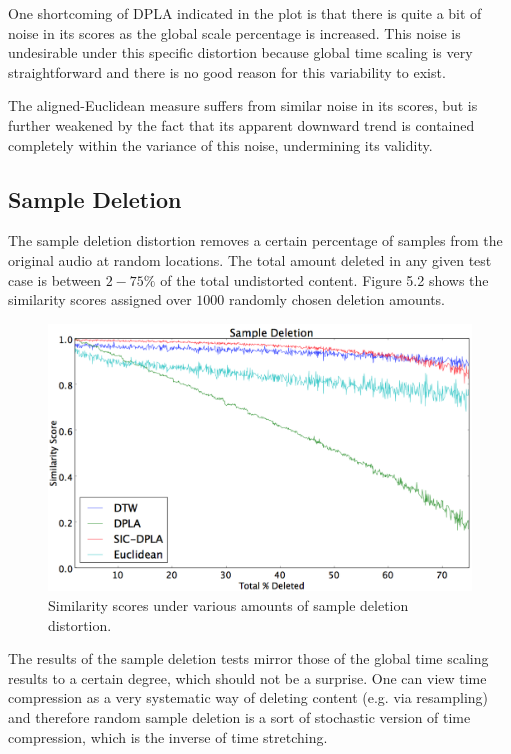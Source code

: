\documentclass[12pt]{report} 	%
\numberwithin{figure}{chapter}
\numberwithin{table}{chapter}
\numberwithin{equation}{chapter}
\begin{document}
\begin{flushleft}
One shortcoming of DPLA indicated in the plot is that there is quite a bit of noise in its scores as the global scale percentage is increased. This noise is undesirable under this specific distortion because global time scaling is very straightforward and there is no good reason for this variability to exist.

The aligned-Euclidean measure suffers from similar noise in its scores, but is further weakened by the fact that its apparent downward trend is contained completely within the variance of this noise, undermining its validity.

\subsection{Sample Deletion}
The sample deletion distortion removes a certain percentage of samples from the original audio at random locations. The total amount deleted in any given test case is between $2-75\%$ of the total undistorted content. Figure 5.2 shows the similarity scores assigned over $1000$ randomly chosen deletion amounts.
\begin{figure}[h!]
\begin{center}
\includegraphics[scale=0.5,width=\linewidth]{SampleDeletion}
\caption[Sample deletion results]{Similarity scores under various amounts of sample deletion distortion.}
\end{center}
\end{figure}
The results of the sample deletion tests mirror those of the global time scaling results to a certain degree, which should not be a surprise. One can view time compression as a very systematic way of deleting content (e.g. via resampling) and therefore random sample deletion is a sort of stochastic version of time compression, which is the inverse of time stretching. 


\end{flushleft}
\end{document}
